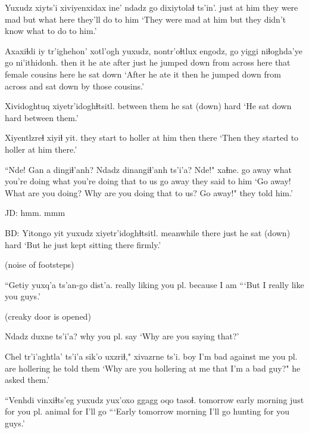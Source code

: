 \documentclass[12pt]{article}
\begin{document}
\gll Yuxudz xiyts'i xiviyenxidax ine' ndadz go   dixiytolaɬ        ts'in'.
just   {at him} {they were mad} but  what  here {they'll do to him }
\glt `They were mad at him but they didn't know what to do to him.'
\glend

\gll Axaxiɬdi iy tr'ighehon' xotl'ogh yuxudz, nontr'oɬtlux   engodz,      go   yiggi niɬoghda'ye go   ni'ithidonh.
then   it {he ate}      after    just   {he jumped down} {from across} here that  {female cousins}     here {he sat down}
\glt `After he ate it then he jumped down from across and sat down by those cousins.'
\glend

\gll Xividoghtuq    xiyetr'idoghɬtsitl.
{between them} {he sat (down) hard}
\glt `He sat down hard between them.'
\glend

\gll Xiyentlzreɬ                 xiyiɬ yit.
{they start to holler at him } then  there
\glt `Then they started to holler at him there.'
\glend

\gll ``Nde! Gan  a dingiɬ'anh?    Ndadz dinangiɬ'anh    ts'i'a? Nde!"   xaɬne.
{{go away}} what {}  {you're doing}   what  {you're doing that to us}   {}{}      {go away} {they said to him}
\glt `Go away! What are you doing? Why are you doing that to us? Go away!" they told him.'
\glend

JD:  hmm. mmm

BD:  
\gll Yitongo   yit   yuxudz xiyetr'idoghɬtsitl.
meanwhile there just   {he sat (down) hard}
\glt `But he just kept sitting there firmly.'
\glend

(noise of footsteps)

\gll ``Getiy  yuxq'a         ts'an-go dist'a. 
 really {liking you pl.} because  {I am   }
\glt ```But I really like you guys.'
\glend

(creaky door is opened)

\gll Ndadz duxne       ts'i'a?
why   {you pl. say}
\glt `Why are you saying that?'
\glend

\gll Chel tr'i'aghtla'  ts'i'a sik'o      uxzriɬ,"              xivazrne ts'i.
boy  {I'm bad}  {}       {against me} {you pl. are hollering} {he told them}
\glt `Why are you hollering at me that I'm a bad guy?" he asked them.'
\glend

\gll ``Venhdi   vinxiɬts'eg   yuxudz yux'oxo     ggagg  oqo tasoɬ.
 tomorrow {early morning} just   {for you pl.} animal for {I'll go}
\glt ```Early tomorrow morning I'll go hunting for you guys.'
\glend
\end{document}
